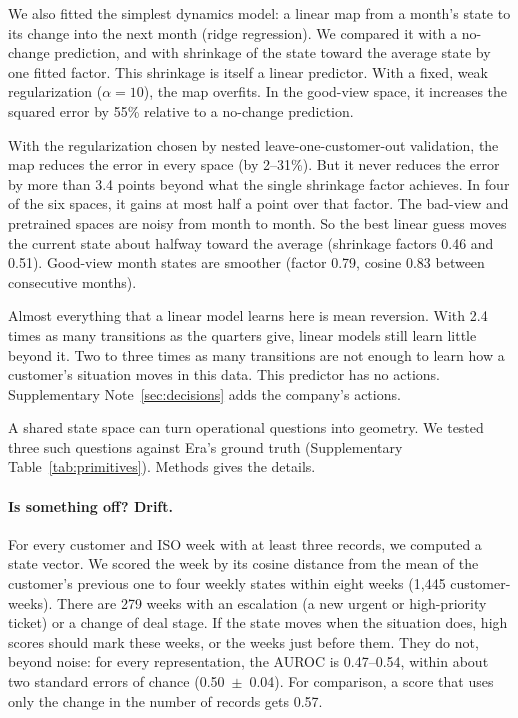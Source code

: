 \documentclass[11pt]{article}
\begin{document}
We also fitted the simplest dynamics model: a linear map from a month's state to its change into the next month (ridge regression). We compared it with a no-change prediction, and with shrinkage of the state toward the average state by one fitted factor. This shrinkage is itself a linear predictor. With a fixed, weak regularization ($\alpha = 10$), the map overfits. In the good-view space, it increases the squared error by 55\% relative to a no-change prediction.

With the regularization chosen by nested leave-one-customer-out validation, the map reduces the error in every space (by 2--31\%). But it never reduces the error by more than 3.4 points beyond what the single shrinkage factor achieves. In four of the six spaces, it gains at most half a point over that factor. The bad-view and pretrained spaces are noisy from month to month. So the best linear guess moves the current state about halfway toward the average (shrinkage factors 0.46 and 0.51). Good-view month states are smoother (factor 0.79, cosine 0.83 between consecutive months).

Almost everything that a linear model learns here is mean reversion. With 2.4 times as many transitions as the quarters give, linear models still learn little beyond it. Two to three times as many transitions are not enough to learn how a customer's situation moves in this data. This predictor has no actions. Supplementary Note~\ref{sec:decisions} adds the company's actions.

A shared state space can turn operational questions into geometry. We tested three such questions against Era's ground truth (Supplementary Table~\ref{tab:primitives}). Methods gives the details.

\paragraph{Is something off? Drift.} For every customer and ISO week with at least three records, we computed a state vector. We scored the week by its cosine distance from the mean of the customer's previous one to four weekly states within eight weeks (1{,}445 customer-weeks). There are 279 weeks with an escalation (a new urgent or high-priority ticket) or a change of deal stage. If the state moves when the situation does, high scores should mark these weeks, or the weeks just before them. They do not, beyond noise: for every representation, the AUROC is 0.47--0.54, within about two standard errors of chance (0.50~$\pm$~0.04). For comparison, a score that uses only the change in the number of records gets 0.57.
\end{document}
